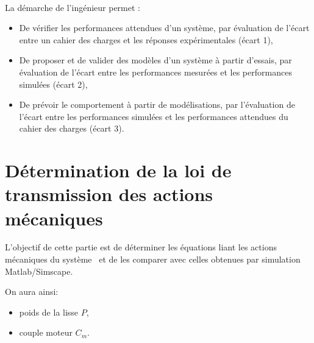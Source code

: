 

 \\

\graphicspath{{../../../img/}}
\begin{center}
\def\svgwidth{\columnwidth}

\end{center}

La démarche de l’ingénieur permet :
\begin{itemize}
 \item De vérifier les performances attendues d’un système, par évaluation de l’écart entre un cahier des charges et les réponses expérimentales (écart 1),
 \item De proposer et de valider des modèles d’un système à partir d’essais, par évaluation de l’écart entre les performances mesurées et les performances simulées (écart 2),
 \item De prévoir le comportement à partir de modélisations, par l’évaluation de l’écart entre les performances simulées et les performances attendues du cahier des charges (écart 3).
\end{itemize}


\newpage

\section{Détermination de la loi de transmission des actions mécaniques}

L'objectif de cette partie est de déterminer les équations liant les actions mécaniques du système \systemes\ et de les comparer avec celles obtenues par simulation Matlab/Simscape.

On aura ainsi:
\begin{itemize}
 \item poids de la lisse $P$,
 \item couple moteur $C_m$.
\end{itemize}


